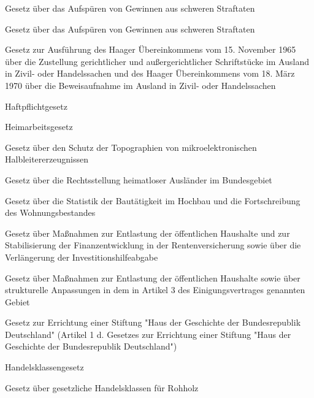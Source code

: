 \item[{GwG-2008}] Gesetz über das Aufspüren von Gewinnen aus schweren Straftaten

\item[{GwG-2017}] Gesetz über das Aufspüren von Gewinnen aus schweren Straftaten

\item[{HaagÜbkAG}] Gesetz zur Ausführung des Haager Übereinkommens vom 15. November 1965 über die Zustellung gerichtlicher und außergerichtlicher Schriftstücke im Ausland in Zivil- oder Handelssachen und des Haager Übereinkommens vom 18. März 1970 über die Beweisaufnahme im Ausland in Zivil- oder Handelssachen

\item[{HaftPflG}] Haftpflichtgesetz

\item[{HAG}] Heimarbeitsgesetz

\item[{HalblSchG}] Gesetz über den Schutz der Topographien von mikroelektronischen Halbleitererzeugnissen

\item[{HAuslG}] Gesetz über die Rechtsstellung heimatloser Ausländer im Bundesgebiet

\item[{HBauStatG}] Gesetz über die Statistik der Bautätigkeit im Hochbau und die Fortschreibung des Wohnungsbestandes

\item[{HBegleitG-1984}] Gesetz über Maßnahmen zur Entlastung der öffentlichen Haushalte und zur Stabilisierung der Finanzentwicklung in der Rentenversicherung sowie über die Verlängerung der Investitionshilfeabgabe

\item[{HBeglG-1991}] Gesetz über Maßnahmen zur Entlastung der öffentlichen Haushalte sowie über strukturelle Anpassungen in dem in Artikel 3 des Einigungsvertrages genannten Gebiet

\item[{HdGStiftG}] Gesetz zur Errichtung einer Stiftung "Haus der Geschichte der Bundesrepublik Deutschland" (Artikel 1 d. Gesetzes zur Errichtung einer Stiftung "Haus der Geschichte der Bundesrepublik Deutschland")

\item[{HdlKlG}] Handelsklassengesetz

\item[{HdlKlHolzG}] Gesetz über gesetzliche Handelsklassen für Rohholz


